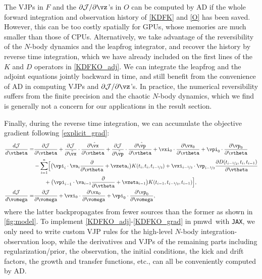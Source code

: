 \documentclass[modern, dvipsnames]{aastex631}
\newcommand{\pmwd}{{\usefont{T1}{nova}{m}{sl}pmwd}}
\renewcommand{\d}{d}
\newcommand{\p}{\partial}
\newcommand{\cJ}{\mathcal{J}}
\newcommand{\half}{\nicefrac12}
\begin{document}
The VJPs in $F$ and the $\p\cJ / \p\vz$'s in $O$ can be computed by AD
if the whole forward integration and observation history of \eqref{KDFK}
and \eqref{O} has been saved.
However, this can be too costly spatially for GPUs, whose memories are
much smaller than those of CPUs.
Alternatively, we take advantage of the reversibility of the $N$-body
dynamics and the leapfrog integrator, and recover the history by reverse
time integration, which we have already included on the first lines of
the $K$ and $D$ operators in \eqref{KDFKO_adj}.
We can integrate the leapfrog and the adjoint equations jointly backward
in time, and still benefit from the convenience of AD in computing VJPs
and $\p\cJ / \p\vz$'s.
In practice, the numerical reversibility suffers from the finite
precision and the chaotic $N$-body dynamics, which we find is generally
not a concern for our applications in the result section.

Finally, during the reverse time integration, we can accumulate the
objective gradient following \eqref{explicit_grad}:
%
\begin{align}
\frac{\d\cJ}{\d\vtheta} =& \frac{\p\cJ}{\p\vtheta}
%
  + \frac{\p\cJ}{\p\hat\vx} \cdot \frac{\p\hat\vx}{\p\vtheta}
  + \frac{\p\cJ}{\p\hat\vp} \cdot \frac{\p\hat\vp}{\p\vtheta}
%
  + \vxi_0 \cdot \frac{\p\vx_0}{\p\vtheta}
  + \vpi_0 \cdot \frac{\p\vp_0}{\p\vtheta} \nonumber\\
%
  &- \sum_{i=1}^n \Bigl[
    \bigl( \vpi_i \cdot\va_i \frac\p{\p\vtheta} + \vzeta_i
      \bigr) K(t_i, t_i, t_{i-\half})
    + \vxi_{i-\half} \cdot \vp_{i-\half}
      \frac{\p D(t_{i-\half}, t_i, t_{i-1})}{\p\vtheta} \nonumber\\
    &\qquad + \bigl( \vpi_{i-1} \cdot \va_{i-1} \frac\p{\p\vtheta}
      + \vzeta_{i-1} \bigr) K(t_{i-1}, t_{i-\half}, t_{i-1})
    \Bigr], \nonumber\\
%
\frac{\d\cJ}{\d\vomega} =& \frac{\p\cJ}{\p\vomega}
%
  + \vxi_0 \cdot \frac{\p\vx_0}{\p\vomega}
  + \vpi_0 \cdot \frac{\p\vp_0}{\p\vomega},
\label{KDFKO_grad}
\end{align}
%
where the latter backpropagates from fewer sources than the former as
shown in \autoref{fig:model}.
To implement \eqref{KDFKO_adj}-\eqref{KDFKO_grad} in \pmwd\ with
\texttt{JAX}, we only need to write custom VJP rules for the high-level
$N$-body integration-observation loop, while the derivatives and VJPs of
the remaining parts including regularization/prior, the observation, the
initial conditions, the kick and drift factors, the growth and transfer
functions, etc., can all be conveniently computed by AD.
\end{document}
